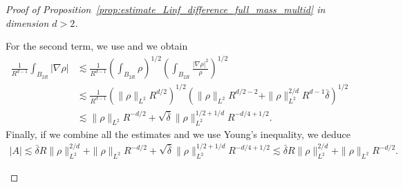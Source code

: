 \documentclass[11pt,a4paper]{article}
\numberwithin{equation}{section}
\newcommand{\R}{{\mathbb{R}}}
\theoremstyle{plain}
\theoremstyle{remark}
\newcommand {\f}{\frac}
\newcommand{\diff}{\mathop{}\!\mathrm{d}}
\begin{document}
\begin{proof}[Proof of Proposition~\ref{prop:estimate_Linf_difference_full_mass_multid} in dimension $d>2$]
\begin{enumeratesteps}
For the second term, we use   and we obtain 
\begin{align*}
\f{1}{R^{d-1}} \int_{B_{2R}} |\nabla\rho| &\lesssim \f{1}{R^{d-1}}\left(\int_{B_{2R}}\rho\right)^{1/2}\left(\int_{B_{2R}}\f{|\nabla \rho|^2}{\rho}\right)^{1/2}\\
&\lesssim \f{1}{R^{d-1}}\left(\|\rho\|_{L^2} R^{d/2}\right)^{1/2}\left(\|\rho\|_{L^{2}} R^{d/2-2} + \|\rho\|_{L^{2}}^{2/d} R^{d-1}\bar\delta\right)^{1/2}\\
&\lesssim \|\rho\|_{L^2}R^{-d/2} + \sqrt{\bar\delta}\|\rho\|_{L^2}^{1/2+1/d}R^{-d/4 +1/2}.
\end{align*}
Finally, if we combine all the estimates and we use Young's inequality, we deduce 
\begin{align*}
|A| \lesssim \bar\delta R\|\rho\|_{L^2}^{2/d} + \|\rho\|_{L^2} R^{-d/2} + \sqrt{\bar\delta}\|\rho\|_{L^2}^{1/2+1/d}R^{-d/4 +1/2} \lesssim \bar\delta R\|\rho\|_{L^2}^{2/d} + \|\rho\|_{L^2} R^{-d/2}.
\end{align*}


\end{enumeratesteps}
\end{proof}
\end{document}
